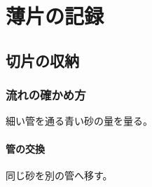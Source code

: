 \documentclass[lualatex,ja=standard,oneside,jbase=11pt]{bxjsreport}
\begin{document}
\part{薄片の記録}
\chapter{切片の収納}
\section{流れの確かめ方}
細い管を通る青い砂の量を量る。
\subsection{管の交換}
同じ砂を別の管へ移す。
\end{document}
